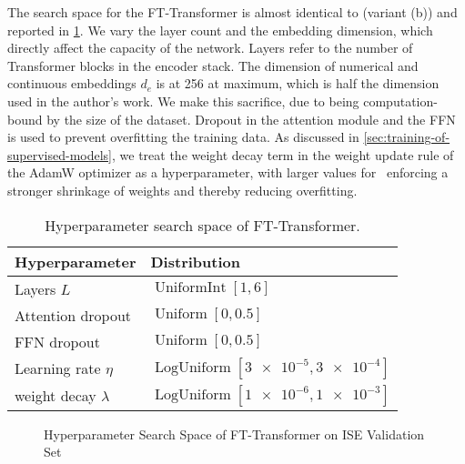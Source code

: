 The search space for the FT-Transformer is almost identical to \textcite[][18]{gorishniyRevisitingDeepLearning2021} (variant (b)) and reported in \cref{tab:hyperparameter-space-2}. We vary the layer count and the embedding dimension, which directly affect the capacity of the network. Layers refer to the number of Transformer blocks in the encoder stack. The dimension of numerical and continuous embeddings $d_e$ is at \num{256} at maximum, which is half the dimension used in the author's work. We make this sacrifice, due to being computation-bound by the size of the dataset. Dropout \autocite[][1930]{srivastavaDropoutSimpleWay} in the attention module and the \gls{FFN} is used to prevent overfitting the training data. As discussed in \cref{sec:training-of-supervised-models}, we treat the weight decay term in the weight update rule of the AdamW optimizer as a hyperparameter, with larger values for \lambda~enforcing a stronger shrinkage of weights and thereby reducing overfitting.

\begin{table}[H]
    \centering
    \caption[Hyperparameter Search Space of FT-Transformer]{Hyperparameter search space of FT-Transformer.}
    \label{tab:hyperparameter-space-2}
    \begin{tabular}{@{}ll@{}}
        \toprule
        Hyperparameter         & Distribution                                        \\ \midrule
        Layers $L$             & $\operatorname{UniformInt}[1,6]$                    \\
        Attention dropout      & $\operatorname{Uniform}[0, 0.5]$                    \\
        \gls{FFN} dropout      & $\operatorname{Uniform}[0, 0.5]$                    \\
        Learning rate $\eta$   & $\operatorname{LogUniform}[\num{3e-5}, \num{3e-4}]$ \\
        weight decay $\lambda$ & $\operatorname{LogUniform}[\num{1e-6}, \num{1e-3}]$ \\ \bottomrule
    \end{tabular}
\end{table}

\begin{figure}[!b]
    \vfill
\end{figure}
\clearpage
\begin{figure}[ht]
    \addtocounter{figure}{-1}
    \caption[]{Hyperparameter Search Space of FT-Transformer on \gls{ISE} Validation Set}
    \label{fig:ise-fttransformer-hyperparam}
\end{figure}

